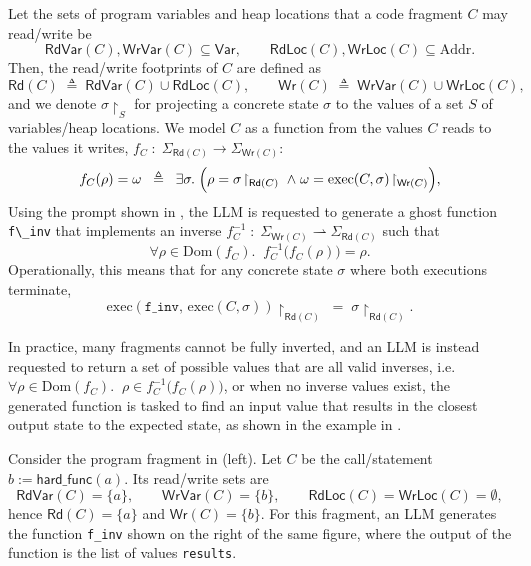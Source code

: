 \documentclass[acmsmall]{acmart}
\theoremstyle{definition}
\begin{document}
Let the sets of program variables and heap locations that a code fragment \(C\) may read/write be
\[
\mathsf{RdVar}(C),\mathsf{WrVar}(C)\subseteq \mathsf{Var},\qquad
\mathsf{RdLoc}(C),\mathsf{WrLoc}(C)\subseteq \mathrm{Addr}.
\]
Then, the read/write footprints of \(C\) are defined as
\[
\mathsf{Rd}(C)\;\triangleq\;\mathsf{RdVar}(C)\cup \mathsf{RdLoc}(C),
\qquad
\mathsf{Wr}(C)\;\triangleq\;\mathsf{WrVar}(C)\cup \mathsf{WrLoc}(C),
\]
and we denote \(\sigma\!\upharpoonright_{S}\) for projecting a concrete state \(\sigma\) to the values of a set \(S\) of variables/heap locations. We model \(C\) as a function from the values $C$ reads to the values it writes, $f_C \;:\; \Sigma_{\mathsf{Rd}(C)} \rightarrow \Sigma_{\mathsf{Wr}(C)}$:
\[
f_C(\rho)=\omega
\;\;\triangleq\;\;
\exists \sigma.\;
\Bigl(\rho=\sigma\!\upharpoonright_{\mathsf{Rd}(C)}
\;\wedge\;
\omega=\mathrm{exec}(C,\sigma)\!\upharpoonright_{\mathsf{Wr}(C)}\Bigr),
\]
\noindent Using the prompt shown in , the LLM is requested to generate a ghost function \lstinline[style=PaperCode]|f\_inv| that implements an inverse $f^{-1}_C \;:\; \Sigma_{\mathsf{Wr}(C)} \rightharpoonup \Sigma_{\mathsf{Rd}(C)}$ such that
\[
\forall \rho\in \mathrm{Dom}(f_C).\;\;
f^{-1}_C\!\bigl(f_C(\rho)\bigr)=\rho.
\]
Operationally, this means that for any concrete state \(\sigma\) where both executions terminate,
\[
\mathrm{exec}(\mathtt{f\_inv},\,\mathrm{exec}(C,\sigma))\!\upharpoonright_{\mathsf{Rd}(C)}
\;=\;
\sigma\!\upharpoonright_{\mathsf{Rd}(C)}.
\]

In practice, many fragments cannot be fully inverted, and an LLM is instead requested to return a set of possible values that are all valid inverses, i.e. $\forall \rho\in \mathrm{Dom}(f_C).\;\; \rho \in f^{-1}_C\!\bigl(f_C(\rho)\bigr)$, or when no inverse values exist, the generated function is tasked to find an input value that results in the closest output state to the expected state, as shown in the example in .

\begin{example}
  Consider the program fragment in  (left). Let $C$ be the call/statement $b := \mathsf{hard\_func}(a)$. Its read/write sets are 
\[
\mathsf{RdVar}(C)=\{a\},\qquad \mathsf{WrVar}(C)=\{b\},\qquad \mathsf{RdLoc}(C)=\mathsf{WrLoc}(C)=\emptyset,
\]
hence $\mathsf{Rd}(C)=\{a\}$ and $\mathsf{Wr}(C)=\{b\}$. For this fragment, an LLM generates the function \lstinline[style=PaperCode]|f_inv| shown on the right of the same figure, where the output of the function is the list of values \lstinline[style=PaperCode]|results|.
\end{example}
  
\end{document}
